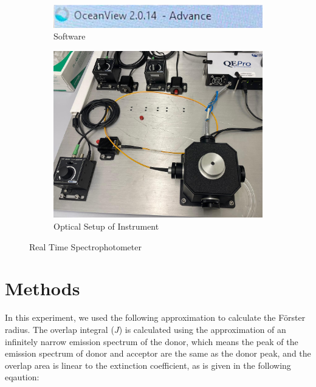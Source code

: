 \documentclass[a4paper,english,12pt,bibliography=totoc]{scrreprt}
\begin{document}
\begin{figure}[H]
    \centering
    \begin{subfigure}[b]{0.45\textwidth}
        \centering
        \includegraphics[width=\textwidth]{Instruments/emission software.png} %
        \caption{Software}
        \label{fig:subfigure1}
    \end{subfigure}
    \hfill
    \begin{subfigure}[b]{0.45\textwidth}
        \centering
        \includegraphics[width=\textwidth]{Instruments/spectrum meter.png} %
        \caption{Optical Setup of Instrument}
        \label{fig:subfigure2}
    \end{subfigure}
    \caption{Real Time Spectrophotometer}
    \label{fig:mainfigure}
\end{figure}

\section{Methods}

In this experiment, we used the following approximation to calculate the Förster radius. The overlap integral (\(J\)) is calculated using the approximation of an infinitely narrow emission spectrum of the donor, which means the peak of the emission spectrum of donor and acceptor are the same as the donor peak, and the overlap area is linear to the extinction coefficient, as is given in the following eqaution:
\end{document}
